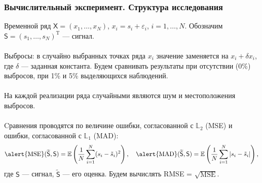 \documentclass[10pt, ucs, notheorems, handout]{beamer}
\newcommand{\tX}[1]{\mathsf{#1}}
\begin{document}
\begin{frame}
\frametitle{Вычислительный эксперимент. Структура исследования}
Временной ряд $\tX{X}=(x_1, \ldots, x_{N})$, $x_i = s_i + \varepsilon_i$, $i=1,\ldots,N$. Обозначим $\tX{S} = (s_1,\ldots,s_N)^\mathrm{T}$ --- сигнал. \\
~~\\

\alert{Выбросы:} в случайно выбранных точках ряда $x_i$ значение заменяется на $x_i + \delta x_i$, где $\delta$ --- заданная константа. Будем сравнивать результаты при отсутствии (0\%) выбросов, при 1\% и 5\% выделяющихся наблюдений. \\
~~\\

На каждой реализации ряда случайными являются шум и местоположения выбросов. \\
~\\

Cравнения проводятся по величине ошибки, согласованной с $\mathbb{L}_2$ (MSE) и ошибки, согласованной с $\mathbb{L}_1$ (MAD):
\begin{equation*}
\text{\alert{MSE}}(\widetilde{\tX{S}},\tX{S}) = \mathbb{E} \left(\frac{1}{N} \sum \limits_{i=1}^{N}(s_i - \tilde s_i )^2 \right), ~~~ \text{\alert{MAD}}(\widetilde{\tX{S}},\tX{S}) = \mathbb{E} \left(\frac{1}{N} \sum \limits_{i=1}^{N}|s_i - \tilde s_i | \right),
\end{equation*}
где $\tX{S}$ --- сигнал, $\widetilde{\tX{S}}$ --- его оценка.
Будем вычислять \alert{RMSE} = $\sqrt{\textrm{MSE}}$. %
\end{frame}
\end{document}

